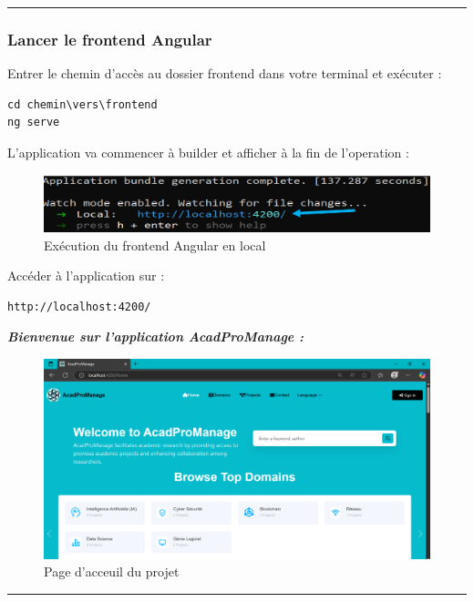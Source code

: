 \documentclass[12pt]{article}
\begin{document}
\rule{\linewidth}{0.2pt}
\newpage
    \subsubsection{Lancer le frontend Angular}
       
Entrer le chemin d’accès au dossier frontend dans votre terminal et exécuter :
        \begin{lstlisting}
cd chemin\vers\frontend
ng serve
        \end{lstlisting}
L'application va commencer à builder et afficher à la fin de l'operation :
            \begin{figure}[h] 
                \centering 
                \includegraphics[width=1\textwidth]{./img/angular.png} 
                \caption{Exécution du frontend Angular en local}
            \end{figure}

Accéder à l'application sur :
    \begin{lstlisting}
http://localhost:4200/
    \end{lstlisting}

\vspace{0.5cm}
\vfill
{\fontsize{17}{28}\textbf{\textit{Bienvenue sur l'application AcadProManage :}}}
            \begin{figure}[h] 
                \centering 
                \includegraphics[width=1\textwidth]{./img/ok.png} 
                \caption{Page d'acceuil du projet}
            \end{figure}

\rule{\linewidth}{0.2pt}
\end{document}
